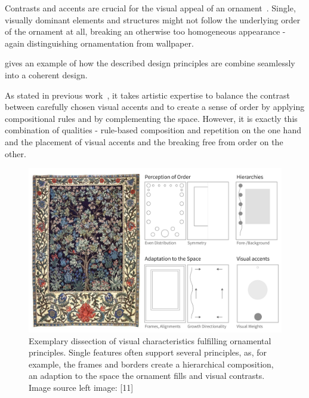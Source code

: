 Contrasts and accents are crucial for the visual appeal of an ornament~\cite{wong_1998_cgf,ward_1896_tpo, moughtin_1999_udo}. Single, visually dominant elements and structures might not follow the underlying order of the ornament at all, breaking an otherwise too homogeneous appearance - again distinguishing ornamentation from wallpaper.

 gives an example of how the described design principles are combine seamlessly into a coherent design.


As stated in previous work~\cite{gieseke_2017_ooo}, it takes artistic expertise to balance the contrast between carefully chosen visual accents and to create a sense of order by applying compositional rules and by complementing the space. However, it is exactly this combination of qualities - rule-based composition and repetition on the one hand and the placement of visual accents and the breaking free from order on the other.


\begin{figure}
       \includegraphics[width=1\columnwidth]{figures/ornament/ornament_principles.png}
 \caption[Ornamentation principles]{\label{fig:ornamentation_principles} Exemplary dissection of visual characteristics fulfilling ornamental principles. Single features often support several principles, as, for example, the frames and borders create a hierarchical composition, an adaption to the space the ornament fills and visual contrasts. Image source left image: [11]}
\end{figure}


